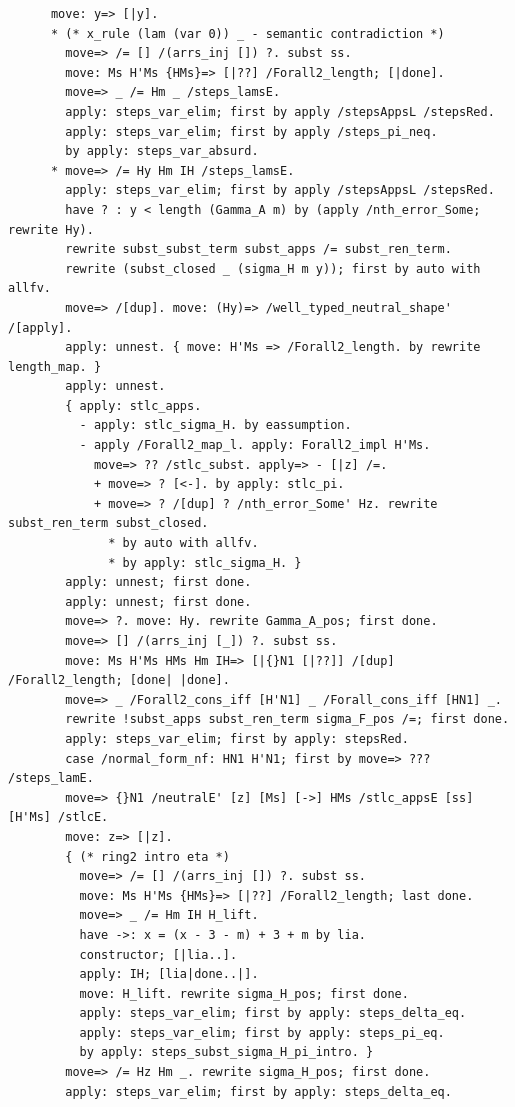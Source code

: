 \begin{lstlisting}
      move: y=> [|y].
      * (* x_rule (lam (var 0)) _ - semantic contradiction *)
        move=> /= [] /(arrs_inj []) ?. subst ss.
        move: Ms H'Ms {HMs}=> [|??] /Forall2_length; [|done].
        move=> _ /= Hm _ /steps_lamsE.
        apply: steps_var_elim; first by apply /stepsAppsL /stepsRed.
        apply: steps_var_elim; first by apply /steps_pi_neq.
        by apply: steps_var_absurd.
      * move=> /= Hy Hm IH /steps_lamsE.
        apply: steps_var_elim; first by apply /stepsAppsL /stepsRed.
        have ? : y < length (Gamma_A m) by (apply /nth_error_Some; rewrite Hy).
        rewrite subst_subst_term subst_apps /= subst_ren_term.
        rewrite (subst_closed _ (sigma_H m y)); first by auto with allfv.
        move=> /[dup]. move: (Hy)=> /well_typed_neutral_shape' /[apply].
        apply: unnest. { move: H'Ms => /Forall2_length. by rewrite length_map. }
        apply: unnest.
        { apply: stlc_apps.
          - apply: stlc_sigma_H. by eassumption.
          - apply /Forall2_map_l. apply: Forall2_impl H'Ms.
            move=> ?? /stlc_subst. apply=> - [|z] /=.
            + move=> ? [<-]. by apply: stlc_pi.
            + move=> ? /[dup] ? /nth_error_Some' Hz. rewrite subst_ren_term subst_closed.
              * by auto with allfv.
              * by apply: stlc_sigma_H. }
        apply: unnest; first done.
        apply: unnest; first done.
        move=> ?. move: Hy. rewrite Gamma_A_pos; first done.
        move=> [] /(arrs_inj [_]) ?. subst ss.
        move: Ms H'Ms HMs Hm IH=> [|{}N1 [|??]] /[dup] /Forall2_length; [done| |done].
        move=> _ /Forall2_cons_iff [H'N1] _ /Forall_cons_iff [HN1] _.
        rewrite !subst_apps subst_ren_term sigma_F_pos /=; first done.
        apply: steps_var_elim; first by apply: stepsRed.
        case /normal_form_nf: HN1 H'N1; first by move=> ??? /steps_lamE.
        move=> {}N1 /neutralE' [z] [Ms] [->] HMs /stlc_appsE [ss] [H'Ms] /stlcE.
        move: z=> [|z].
        { (* ring2 intro eta *)
          move=> /= [] /(arrs_inj []) ?. subst ss.
          move: Ms H'Ms {HMs}=> [|??] /Forall2_length; last done.
          move=> _ /= Hm IH H_lift. 
          have ->: x = (x - 3 - m) + 3 + m by lia.
          constructor; [|lia..].
          apply: IH; [lia|done..|].
          move: H_lift. rewrite sigma_H_pos; first done.
          apply: steps_var_elim; first by apply: steps_delta_eq.
          apply: steps_var_elim; first by apply: steps_pi_eq.
          by apply: steps_subst_sigma_H_pi_intro. }
        move=> /= Hz Hm _. rewrite sigma_H_pos; first done.
        apply: steps_var_elim; first by apply: steps_delta_eq.

\end{lstlisting}

